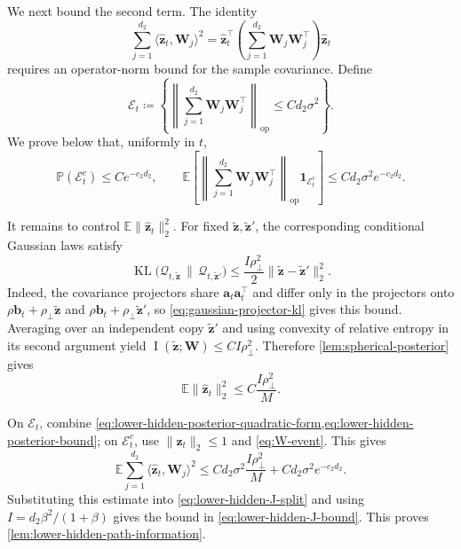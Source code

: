\documentclass[11pt]{article}
\newcommand{\trans}{\top}
\newcommand{\op}{\mathrm{op}}
\begin{document}
We next bound the second term.  The identity
\begin{equation}
  \sum_{j=1}^{d_2}
  \langle\widehat{\bm z}_t,\bm W_j\rangle^2
  =
  \widehat{\bm z}_t^\trans
  \left(\sum_{j=1}^{d_2}\bm W_j\bm W_j^\trans\right)
  \widehat{\bm z}_t
\label{eq:lower-hidden-posterior-quadratic-form}
\end{equation}
requires an operator-norm bound for the sample covariance.  Define
\begin{equation}
  \mathcal E_t
  \coloneqq
  \left\{
    \left\|\sum_{j=1}^{d_2}\bm W_j\bm W_j^\trans\right\|_{\op}
    \le
    Cd_2\sigma^2
  \right\}.
\label{eq:lower-hidden-scatter-event}
\end{equation}
We prove below that, uniformly in $t$,
\begin{equation}
  \mathbb P(\mathcal E_t^c)\le Ce^{-c_2d_2},
  \qquad
  \mathbb E\left[
    \left\|\sum_{j=1}^{d_2}\bm W_j\bm W_j^\trans\right\|_{\op}
    \bm1_{\mathcal E_t^c}
  \right]
  \le
  Cd_2\sigma^2e^{-c_2d_2}.
\label{eq:W-event}
\end{equation}

It remains to control $\mathbb E\|\widehat{\bm z}_t\|_2^2$.  For fixed
$\widetilde{\bm z},\widetilde{\bm z}'$, the corresponding conditional
Gaussian laws satisfy
\begin{equation}
  \operatorname{KL}\bigl(
    \mathcal Q_{t,\widetilde{\bm z}}
    \,\|\,
    \mathcal Q_{t,\widetilde{\bm z}'}
  \bigr)
  \le
  \frac{I\rho_\perp^2}{2}
  \|\widetilde{\bm z}-\widetilde{\bm z}'\|_2^2.
\label{eq:lower-hidden-conditional-KL}
\end{equation}
Indeed, the covariance projectors share $\bm a_t\bm a_t^\trans$ and differ
only in the projectors onto
$\rho\bm b_t+\rho_\perp\widetilde{\bm z}$ and
$\rho\bm b_t+\rho_\perp\widetilde{\bm z}'$, so
\cref{eq:gaussian-projector-kl} gives this bound.  Averaging over an
independent copy $\widetilde{\bm z}'$ and using convexity of relative entropy
in its second argument yield
$\operatorname{I}(\widetilde{\bm z};\bm W)\le CI\rho_\perp^2$.
Therefore \cref{lem:spherical-posterior} gives
\begin{equation}
  \mathbb E\|\widehat{\bm z}_t\|_2^2
  \le
  C\frac{I\rho_\perp^2}{M}.
\label{eq:lower-hidden-posterior-bound}
\end{equation}

On $\mathcal E_t$, combine
\cref{eq:lower-hidden-posterior-quadratic-form,eq:lower-hidden-posterior-bound};
on $\mathcal E_t^c$, use $\|\widehat{\bm z}_t\|_2\le1$ and
\cref{eq:W-event}.  This gives
\begin{equation}
  \mathbb E\sum_{j=1}^{d_2}
  \langle\widehat{\bm z}_t,\bm W_j\rangle^2
  \le
  Cd_2\sigma^2\frac{I\rho_\perp^2}{M}
  +
  Cd_2\sigma^2e^{-c_2d_2}.
\label{eq:lower-hidden-posterior-energy}
\end{equation}
Substituting this estimate into \cref{eq:lower-hidden-J-split} and using
$I=d_2\beta^2/(1+\beta)$ gives the bound in
\cref{eq:lower-hidden-J-bound}.  This proves
\cref{lem:lower-hidden-path-information}.
\end{document}
